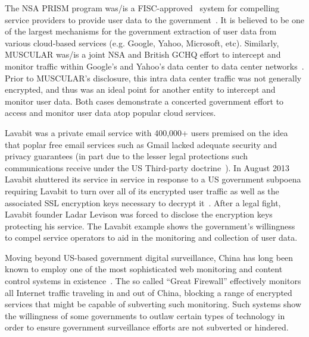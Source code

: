 \begin{packed_desc}
\item[PRISM and MUSCULAR:] The NSA PRISM program was/is a
  FISC-approved~\cite{fisc} system for compelling service providers to
  provide user data to the government~\cite{greenwald-prism}. It is
  believed to be one of the largest mechanisms for the government
  extraction of user data from various cloud-based services
  (e.g. Google, Yahoo, Microsoft, etc). Similarly, MUSCULAR was/is a
  joint NSA and British GCHQ effort to intercept and monitor traffic
  within Google's and Yahoo's data center to data center
  networks~\cite{gellman-muscular}. Prior to MUSCULAR's disclosure,
  this intra data center traffic was not generally encrypted, and thus
  was an ideal point for another entity to intercept and monitor user
  data. Both cases demonstrate a concerted government effort to access
  and monitor user data atop popular cloud services.
\item[Lavabit:] Lavabit was a private email service with 400,000+
  users premised on the idea that poplar free email services such as
  Gmail lacked adequate security and privacy guarantees (in part due
  to the lesser legal protections such communications receive under
  the US Third-party doctrine~\cite{scotus-usvmiller,
    scotus-smithvmaryland}). In August 2013 Lavabit shuttered its
  service in service in response to a US government subpoena requiring
  Lavabit to turn over all of its encrypted user traffic as well as
  the associated SSL encryption keys necessary to decrypt
  it~\cite{lavabit, levsion-lavabit}. After a legal fight, Lavabit
  founder Ladar Levison was forced to disclose the encryption keys
  protecting his service. The Lavabit example shows the government's
  willingness to compel service operators to aid in the monitoring and
  collection of user data.
\item[The Great Firewall:] Moving beyond US-based government digital
  surveillance, China has long been known to employ one of the most
  sophisticated web monitoring and content control systems in
  existence~\cite{rsf-china}. The so called ``Great Firewall''
  effectively monitors all Internet traffic traveling in and out of
  China, blocking a range of encrypted services that might be capable
  of subverting such monitoring. Such systems show the willingness of
  some governments to outlaw certain types of technology in order to
  ensure government surveillance efforts are not subverted or
  hindered.
\end{packed_desc}

